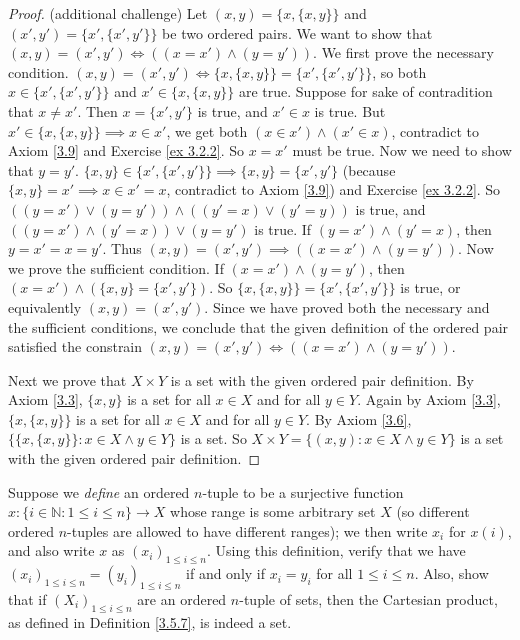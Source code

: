 \begin{proof}{(additional challenge)}
Let \((x, y) = \{x, \{x, y\}\}\) and \((x', y') = \{x', \{x', y'\}\}\) be two ordered pairs.
We want to show that \((x, y) = (x', y') \iff ((x = x') \land (y = y'))\).
We first prove the necessary condition.
\((x, y) = (x', y') \iff \{x, \{x, y\}\} = \{x', \{x', y'\}\}\), so both \(x \in \{x', \{x', y'\}\}\) and \(x' \in \{x, \{x, y\}\}\) are true.
Suppose for sake of contradition that \(x \neq x'\).
Then \(x = \{x', y'\}\) is true, and \(x' \in x\) is true.
But \(x' \in \{x, \{x, y\}\} \implies x \in x'\), we get both \((x \in x') \land (x' \in x)\), contradict to Axiom \ref{3.9} and Exercise \ref{ex 3.2.2}.
So \(x = x'\) must be true.
Now we need to show that \(y = y'\).
\(\{x, y\} \in \{x', \{x', y'\}\} \implies \{x, y\} = \{x', y'\}\) (because \(\{x, y\} = x' \implies x \in x' = x\), contradict to Axiom \ref{3.9}) and Exercise \ref{ex 3.2.2}.
So \(((y = x') \lor (y = y')) \land ((y' = x) \lor (y' = y))\) is true, and \(((y = x') \land (y' = x)) \lor (y = y')\) is true.
If \((y = x') \land (y' = x)\), then \(y = x' = x = y'\).
Thus \((x, y) = (x', y') \implies ((x = x') \land (y = y'))\).
Now we prove the sufficient condition.
If \((x = x') \land (y = y')\), then \((x = x') \land (\{x, y\} = \{x', y'\})\).
So \(\{x, \{x, y\}\} = \{x', \{x', y'\}\}\) is true, or equivalently \((x, y) = (x', y')\).
Since we have proved both the necessary and the sufficient conditions, we conclude that the given definition of the ordered pair satisfied the constrain \((x, y) = (x', y') \iff ((x = x') \land (y = y'))\).

Next we prove that \(X \times Y\) is a set with the given ordered pair definition.
By Axiom \ref{3.3}, \(\{x, y\}\) is a set for all \(x \in X\) and for all \(y \in Y\).
Again by Axiom \ref{3.3}, \(\{x, \{x, y\}\}\) is a set for all \(x \in X\) and for all \(y \in Y\).
By Axiom \ref{3.6}, \(\{\{x, \{x, y\}\} : x \in X \land y \in Y\}\) is a set.
So \(X \times Y = \{(x, y) : x \in X \land y \in Y\}\) is a set with the given ordered pair definition.
\end{proof}

\begin{exercise}\label{ex 3.5.2}
Suppose we \emph{define} an ordered \(n\)-tuple to be a surjective function \(x : \{i \in \mathds{N} : 1 \leq i \leq n\} \to X\) whose range is some arbitrary set \(X\) (so different ordered \(n\)-tuples are allowed to have different ranges);
we then write \(x_i\) for \(x(i)\), and also write \(x\) as \((x_i)_{1 \leq i \leq n}\).
Using this definition, verify that we have \((x_i)_{1 \leq i \leq n} = (y_i)_{1 \leq i \leq n}\) if and only if \(x_i = y_i\) for all \(1 \leq i \leq n\).
Also, show that if \((X_i)_{1 \leq i \leq n}\) are an ordered \(n\)-tuple of sets, then the Cartesian product, as defined in Definition \ref{3.5.7}, is indeed a set.
\end{exercise}

